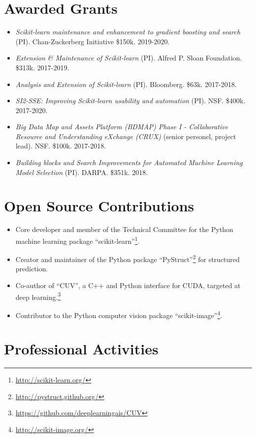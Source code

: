 \documentclass[a4paper,11pt]{article}
\begin{document}
\section{Awarded Grants}
\begin{itemize}
    \item \emph{Scikit-learn maintenance and enhancement to gradient boosting and search} (PI). Chan-Zuckerberg Initiative \$150k. 2019-2020.
    \item \emph{Extension \& Maintenance of Scikit-learn} (PI). Alfred P. Sloan Foundation. \$313k. 2017-2019.
    \item \emph{Analysis and Extension of Scikit-learn} (PI). Bloomberg. \$63k. 2017-2018.
    \item \emph{SI2-SSE: Improving Scikit-learn usability and automation} (PI). NSF. \$400k. 2017-2020.
    \item \emph{Big Data Map and Assets Platform (BDMAP) Phase I - Collaborative Resource and Understanding eXchange (CRUX)} (senior personel, project lead). NSF. \$100k. 2017-2018.
    \item \emph{Building blocks and Search Improvements for Automated Machine Learning Model Selection} (PI). DARPA. \$351k. 2018.
\end{itemize}

\section{Open Source Contributions}
\begin{itemize}
    \item Core developer and member of the Technical Committee for the Python machine learning package ``scikit-learn''\footnote{\url{http://scikit-learn.org/}}.
    \item Creator and maintainer of the Python package ``PyStruct''\footnote{\url{http://pystruct.github.org/}} for structured prediction.
    \item Co-author of ``CUV'', a C++ and Python interface for CUDA,
        targeted at deep learning.\footnote{\url{https://github.com/deeplearningais/CUV}}
    \item Contributor to the Python computer vision package ``scikit-image''\footnote{\url{http://scikit-image.org/}}.
\end{itemize}

\section{Professional Activities}
\end{document}
